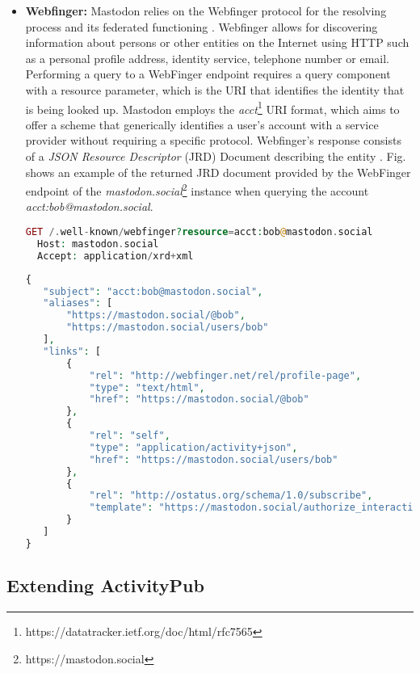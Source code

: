 \begin{itemize}
\item \textbf{Webfinger:}
Mastodon relies on the Webfinger protocol for the resolving process and its federated functioning \cite{rochko_2020}. Webfinger allows for discovering information about persons or other entities on the Internet using HTTP such as a personal profile address, identity service, telephone number or email. Performing a query to a WebFinger endpoint requires a query component with a resource parameter, which is the URI that identifies the identity that is being looked up. Mastodon employs the \emph{acct}\footnote{https://datatracker.ietf.org/doc/html/rfc7565} URI format, which aims to offer a scheme that generically identifies a user's account with a service provider without requiring a specific protocol. Webfinger's response consists of a \emph{JSON Resource Descriptor} (JRD) Document describing the entity \cite{jones_salgueiro_jones_smarr_2013}. Fig. \label{Webfinger response from mastodon.social} shows an example of the returned JRD document provided by the WebFinger endpoint of the \emph{mastodon.social}\footnote{https://mastodon.social} instance when querying the account \emph{acct:bob@mastodon.social}.

\lstset{style=JSONStyle}
\begin{lstlisting}[language=PHP, caption=HTTP request to Webfinger endpoint, label=Webfinger request, float=h]
  GET /.well-known/webfinger?resource=acct:bob@mastodon.social
  Host: mastodon.social
  Accept: application/xrd+xml
\end{lstlisting}

\lstset{style=JSONStyle}
\begin{lstlisting}[language=PHP, caption=Webfinger response, label=Webfinger response from mastodon.social, float=h]
{
   "subject": "acct:bob@mastodon.social",
   "aliases": [
       "https://mastodon.social/@bob",
       "https://mastodon.social/users/bob"
   ],
   "links": [
       {
           "rel": "http://webfinger.net/rel/profile-page",
           "type": "text/html",
           "href": "https://mastodon.social/@bob"
       },
       {
           "rel": "self",
           "type": "application/activity+json",
           "href": "https://mastodon.social/users/bob"
       },
       {
           "rel": "http://ostatus.org/schema/1.0/subscribe",
           "template": "https://mastodon.social/authorize_interaction?uri={uri}"
       }
   ]
}
\end{lstlisting}
\end{itemize}

\subsection{Extending ActivityPub}\label{sec:extending_activitypub}


